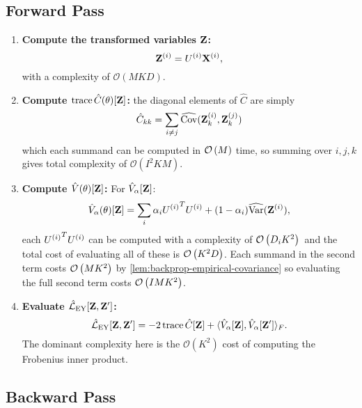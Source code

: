 \subsection*{Forward Pass}
\begin{enumerate}
    \item \textbf{Compute the transformed variables \(\mathbf{Z}\):}
    \begin{equation}
        \mathbf{Z}^{(i)} = U^{(i)} \mathbf{X}^{(i)},
    \end{equation}
    with a complexity of \(\mathcal{O}(MKD)\).

    \item \textbf{Compute \(\operatorname{trace}\hat{C}(\theta)[\mathbf{Z}]\):} the diagonal elements of $\hat{C}$ are simply
    \begin{align*}
        \hat{C}_{kk} = \sum_{i \neq j} \widehat{\mathrm{Cov}}(\mathbf{Z}_k^{(i)}, \mathbf{Z}_k^{(j)})
    \end{align*}
    which each summand can be computed in $\mathcal{O}\left({M}\right)$ time, so summing over $i,j,k$ gives total complexity of \(\mathcal{O}(I^2 K M)\).

    \item \textbf{Compute \(\hat{V}(\theta)[\mathbf{Z}]\):}
    For \( \hat{V}_\alpha[\mathbf{Z}] \):
    \begin{align*}
        \hat{V}_\alpha(\theta)[\mathbf{Z}] = \sum_i \alpha_i {U^{(i)}}^T U^{(i)} + (1 - \alpha_i) \widehat{\mathrm{Var}}(\mathbf{Z}^{(i)}),
    \end{align*}
    each ${U^{(i)}}^T U^{(i)}$ can be computed with a complexity of $\mathcal{O}\left({D_i K^2}\right)$\ and the total cost of evaluating all of these is $\mathcal{O}\left({K^2 D}\right)$.
    Each summand in the second term costs $\mathcal{O}\left({M K^2}\right)$ by \cref{lem:backprop-empirical-covariance} so evaluating the full second term costs $\mathcal{O}\left({I MK^2}\right)$.

    \item \textbf{Evaluate \(\hat{\mathcal{L}}_\text{EY}[\mathbf{Z}, \mathbf{Z}']\):}
    \begin{equation}
        \hat{\mathcal{L}}_\text{EY}[\mathbf{Z}, \mathbf{Z}'] = - 2 \operatorname{trace} \hat{C}[\mathbf{Z}] + \langle \hat{V}_\alpha[\mathbf{Z}], \hat{V}_\alpha[\mathbf{Z}'] \rangle_F.
    \end{equation}
    The dominant complexity here is the \(\mathcal{O}(K^2)\) cost of computing the Frobenius inner product.
\end{enumerate}

\subsection*{Backward Pass}

